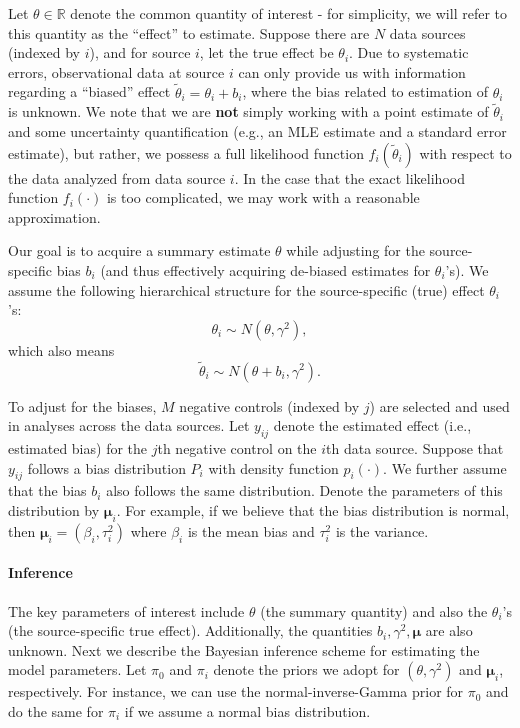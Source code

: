 \documentclass{article}
\begin{document}
Let $\theta \in \mathbb{R}$ denote the common quantity of interest - for simplicity, we will refer to this quantity as the ``effect'' to estimate.
Suppose there are $N$ data sources (indexed by $i$), and for source $i$, let the true effect be $\theta_i$.
Due to systematic errors, observational data at source $i$ can only provide us with information 
regarding a ``biased'' effect $\tilde{\theta}_i = \theta_i + b_i$, where the bias related to estimation of $\theta_i$ is unknown. 
We note that we are \textbf{not} simply working with a point estimate of $\tilde{\theta}_i $ and some uncertainty quantification (e.g., an MLE estimate and a standard error estimate), 
but rather, we possess a full likelihood function $f_i(\tilde{\theta}_i)$ with respect to the data analyzed from data source $i$. 
In the case that the exact likelihood function $f_i(\cdot)$ is too complicated, we may work with a reasonable approximation. 

Our goal is to acquire a summary estimate $\theta$
while adjusting for the source-specific bias $b_i$ (and thus effectively acquiring de-biased estimates for $\theta_i$'s).
We assume the following hierarchical structure for the source-specific (true) effect $\theta_i$'s:
\begin{equation}
\label{eq: theta_i-dist}
    \theta_i \sim N(\theta, \gamma^2),
\end{equation}
which also means
\begin{equation}
    \tilde\theta_i \sim N(\theta+b_i, \gamma^2).
\end{equation}

To adjust for the biases, $M$ negative controls (indexed by $j$) are selected and used in analyses across the data sources.
Let $y_{ij}$ denote the estimated effect (i.e., estimated bias) for the $j$th negative control on the $i$th data source. Suppose that $y_{ij}$ follows a bias distribution $P_i$ with density function $p_i(\cdot)$.
We further assume that the bias $b_i$ also follows the same distribution.
Denote the parameters of this distribution by $\boldsymbol\mu_i$.
For example, if we believe that the bias distribution is normal,
then $\boldsymbol\mu_i = (\beta_i, \tau_i^2)$ where $\beta_i$ is the mean bias and $\tau_i^2$ is the variance.


\paragraph{Inference}
The key parameters of interest include $\theta$ (the summary quantity) and also the $\theta_i$'s (the source-specific true effect).
Additionally, the quantities $b_i, \gamma^2, \boldsymbol\mu$ are also unknown.
Next we describe the Bayesian inference scheme for estimating the model parameters.
Let $\pi_0$ and $\pi_i$ denote the priors we adopt for $(\theta,\gamma^2)$ and $\boldsymbol\mu_i$, respectively.
For instance, we can use the normal-inverse-Gamma prior for $\pi_0$ and do the same for $\pi_i$ if we assume a normal bias distribution.
\end{document}
